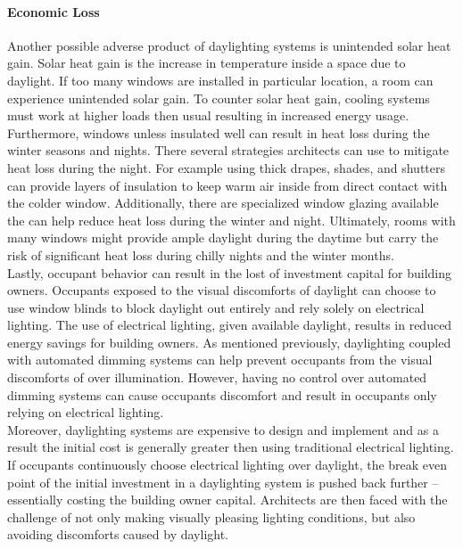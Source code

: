     \paragraph{Economic Loss}
    
    Another possible adverse product of daylighting systems is unintended solar heat gain. Solar heat gain is the increase in temperature inside a space due to daylight. 
    If too many windows are installed in particular location, a room can experience unintended solar gain.
    To counter solar heat gain, cooling systems must work at higher loads then usual resulting in increased energy usage.
    Furthermore, windows unless insulated well can result in heat loss during the winter seasons and nights.
    There several strategies architects can use to mitigate heat loss during the night.
    For example using thick drapes, shades, and shutters can provide layers of insulation to keep warm air inside from direct contact with the colder window.
    Additionally, there are specialized window glazing available the can help reduce heat loss during the winter and night.
    Ultimately, rooms with many windows might provide ample daylight during the daytime but carry the risk of significant heat loss during chilly nights and the winter months.
    \\

    Lastly, occupant behavior can result in the lost of investment capital for building owners.
    Occupants exposed to the visual discomforts of daylight can choose to use window blinds to block daylight out entirely and rely solely on electrical lighting.
    The use of electrical lighting, given available daylight, results in reduced energy savings for building owners.
    As mentioned previously, daylighting coupled with automated dimming systems can help prevent occupants from the visual discomforts of over illumination.
    However, having no control over automated dimming systems can cause occupants discomfort and result in occupants only relying on electrical lighting.%
    \\

    Moreover, daylighting systems are expensive to design and implement and as a result the initial cost is generally greater then using traditional electrical lighting.
    If occupants continuously choose electrical lighting over daylight, the break even point of the initial investment in a daylighting system is pushed back further -- essentially costing the building owner capital.
    Architects are then faced with the challenge of not only making visually pleasing lighting conditions, but also avoiding discomforts caused by daylight.

